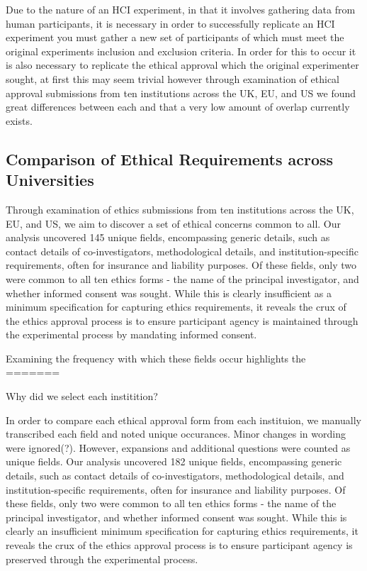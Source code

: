 Due to the nature of an HCI experiment, in that it involves gathering data from human participants, it is necessary in order to successfully replicate an HCI experiment you must gather a new set of participants of which must meet the original experiments inclusion and exclusion criteria. In order for this to occur it is also necessary to replicate the ethical approval which the original experimenter sought, at first this may seem trivial however through examination of ethical approval submissions from ten institutions across the UK, EU, and US we found great differences between each and that a very low amount of overlap currently exists.

\subsection{Comparison of Ethical Requirements across Universities}

Through examination of ethics submissions from ten institutions across the UK, EU, and US,
we aim to discover a set of ethical concerns common to all. 
Our analysis uncovered 145 unique fields, 
encompassing generic details, such as contact details of co-investigators, methodological
details, and institution-specific requirements, often for insurance and liability purposes.
Of these fields, only two were common to all ten ethics forms - the name of the principal
investigator, and whether informed consent was sought. While this is clearly insufficient
as a minimum specification for capturing ethics requirements, it reveals the crux of the 
ethics approval process is to ensure participant agency is maintained through the experimental process by mandating informed consent.

Examining the frequency with which these fields occur highlights the 
=======

Why did we select each institition?



In order to compare each ethical approval form from each instituion, we manually transcribed each field and noted unique occurances. Minor changes in wording were ignored(?). However, expansions and additional questions were counted as unique fields. Our analysis uncovered 182 unique fields, encompassing generic details, such as contact details of co-investigators, methodological details, and institution-specific requirements, often for insurance and liability purposes. Of these fields, only two were common to all ten ethics forms - the name of the principal investigator, and whether informed consent was sought. While this is clearly an insufficient  minimum specification for capturing ethics requirements, it reveals the crux of the ethics approval process is to ensure participant agency is preserved through the experimental process.





